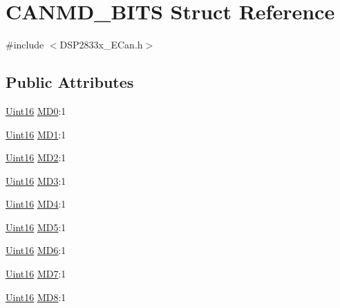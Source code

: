 \hypertarget{struct_c_a_n_m_d___b_i_t_s}{}\section{C\+A\+N\+M\+D\+\_\+\+B\+I\+T\+S Struct Reference}
\label{struct_c_a_n_m_d___b_i_t_s}


{\ttfamily \#include $<$D\+S\+P2833x\+\_\+\+E\+Can.\+h$>$}

\subsection*{Public Attributes}
\begin{DoxyCompactItemize}
\item 
\hyperlink{_d_s_p2833x___device_8h_a59a9f6be4562c327cbfb4f7e8e18f08b}{Uint16} \hyperlink{struct_c_a_n_m_d___b_i_t_s_a5580b0758bb04714c6d9c9fe6eb2c764}{M\+D0}\+:1
\item 
\hyperlink{_d_s_p2833x___device_8h_a59a9f6be4562c327cbfb4f7e8e18f08b}{Uint16} \hyperlink{struct_c_a_n_m_d___b_i_t_s_a7ed54a46b3404e4ed1a653d584ab9a50}{M\+D1}\+:1
\item 
\hyperlink{_d_s_p2833x___device_8h_a59a9f6be4562c327cbfb4f7e8e18f08b}{Uint16} \hyperlink{struct_c_a_n_m_d___b_i_t_s_a0d6783e77487229efe2ae0c77f398433}{M\+D2}\+:1
\item 
\hyperlink{_d_s_p2833x___device_8h_a59a9f6be4562c327cbfb4f7e8e18f08b}{Uint16} \hyperlink{struct_c_a_n_m_d___b_i_t_s_a754bf5e1fcd858257da80d772e1498fd}{M\+D3}\+:1
\item 
\hyperlink{_d_s_p2833x___device_8h_a59a9f6be4562c327cbfb4f7e8e18f08b}{Uint16} \hyperlink{struct_c_a_n_m_d___b_i_t_s_a09049da6f26757714d06b3929bf68e61}{M\+D4}\+:1
\item 
\hyperlink{_d_s_p2833x___device_8h_a59a9f6be4562c327cbfb4f7e8e18f08b}{Uint16} \hyperlink{struct_c_a_n_m_d___b_i_t_s_ad1ffafc846abe348e40993032c08f2f1}{M\+D5}\+:1
\item 
\hyperlink{_d_s_p2833x___device_8h_a59a9f6be4562c327cbfb4f7e8e18f08b}{Uint16} \hyperlink{struct_c_a_n_m_d___b_i_t_s_aeb0da8c72db46ce359de383a4de3f853}{M\+D6}\+:1
\item 
\hyperlink{_d_s_p2833x___device_8h_a59a9f6be4562c327cbfb4f7e8e18f08b}{Uint16} \hyperlink{struct_c_a_n_m_d___b_i_t_s_acd5d0e6df75f8d4981170a3b6261ab24}{M\+D7}\+:1
\item 
\hyperlink{_d_s_p2833x___device_8h_a59a9f6be4562c327cbfb4f7e8e18f08b}{Uint16} \hyperlink{struct_c_a_n_m_d___b_i_t_s_a2b056230f454656386defe68a1fe0747}{M\+D8}\+:1

\end{DoxyCompactItemize}
